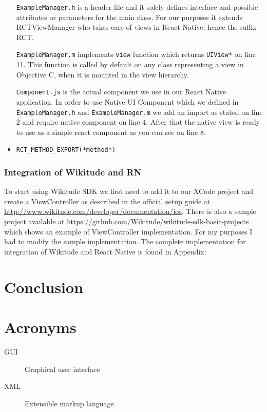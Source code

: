 \documentclass[thesis=M,english]{FITthesis}[2012/10/20]
\begin{document}
\begin{itemize}
  \verb|ExampleManager.h| is a header file and it solely defines interface and possible attributes or parameters for the main class. For our purposes it extends RCTViewManager who takes care of views in React Native, hence the suffix RCT.
  
  \verb|ExampleManager.m| implements \verb|view| function which returns \verb|UIView*| on line 11. This function is called by default on any class representing a view in Objective C, when it is mounted in the view hierarchy.
  
  \verb|Component.js| is the actual component we use in our React Native application. In order to use Native UI Component which we defined in  \verb|ExampleManager.h| and \verb|ExampleManager.m| we add an import as stated on line 2 and require native component on line 4. After that the native view is ready to use as a simple react component as you can see on line 8.
  
\item  \verb|RCT_METHOD_EXPORT(*method*)|

\end{itemize}

\subsection{Integration of Wikitude and RN}
To start using Wikitude SDK we first need to add it to our XCode project and create a ViewController as described in the official setup guide at \url{http://www.wikitude.com/developer/documentation/ios}. There is also a sample project available at \url{https://github.com/Wikitude/wikitude-sdk-basic-projects} which shows an example of ViewController implementation. For my purposes I had to modify the sample implementation. The complete implementation for integration of Wikitude and React Native is found in Appendix: 

\chapter{Conclusion}





\appendix

\chapter{Acronyms}
\begin{description}
	\item[GUI] Graphical user interface
	\item[XML] Extensible markup language
\end{description}
\end{document}
